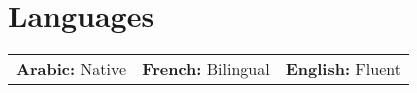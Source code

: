 
\section{\textbf{Languages}}
\vspace{0.5mm}
\hspace*{-2.5mm}
\noindent
\begin{tabularx}{\textwidth}{X X X}
    \textbf{Arabic:} Native & \textbf{French:} Bilingual & \textbf{English:} Fluent
\end{tabularx}
